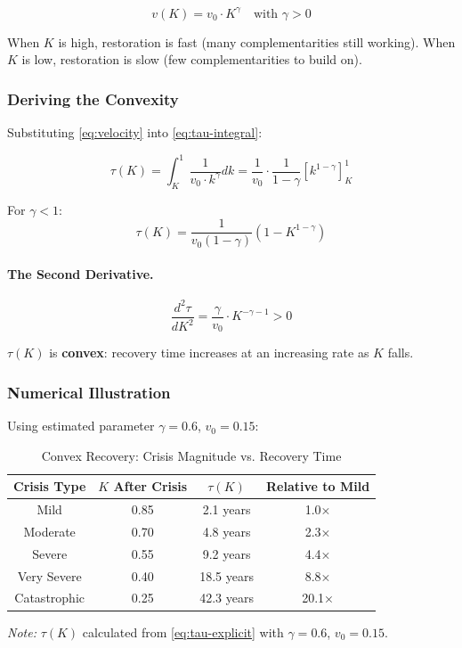\begin{equation}
v(K) = v_0 \cdot K^{\gamma} \quad \text{with } \gamma > 0
\label{eq:velocity}
\end{equation}

When $K$ is high, restoration is fast (many complementarities still working).
When $K$ is low, restoration is slow (few complementarities to build on).

\subsubsection{Deriving the Convexity}

Substituting \eqref{eq:velocity} into \eqref{eq:tau-integral}:

\begin{equation}
\tau(K) = \int_K^{1} \frac{1}{v_0 \cdot k^{\gamma}} dk = \frac{1}{v_0} \cdot \frac{1}{1-\gamma} \left[k^{1-\gamma}\right]_K^1
\end{equation}

For $\gamma < 1$:
\begin{equation}
\tau(K) = \frac{1}{v_0(1-\gamma)} \left(1 - K^{1-\gamma}\right)
\label{eq:tau-explicit}
\end{equation}

\paragraph{The Second Derivative.}
\begin{equation}
\frac{d^2\tau}{dK^2} = \frac{\gamma}{v_0} \cdot K^{-\gamma-1} > 0
\end{equation}

$\tau(K)$ is \textbf{convex}: recovery time increases at an increasing rate 
as $K$ falls.

\subsubsection{Numerical Illustration}

Using estimated parameter $\gamma = 0.6$, $v_0 = 0.15$:

\begin{table}[htbp]
\centering
\caption{Convex Recovery: Crisis Magnitude vs. Recovery Time}
\label{tab:convex-recovery}
\begin{tabular}{@{}cccc@{}}
\toprule
\textbf{Crisis Type} & \textbf{$K$ After Crisis} & \textbf{$\tau(K)$} & \textbf{Relative to Mild} \\
\midrule
Mild & 0.85 & 2.1 years & 1.0× \\
Moderate & 0.70 & 4.8 years & 2.3× \\
Severe & 0.55 & 9.2 years & 4.4× \\
Very Severe & 0.40 & 18.5 years & 8.8× \\
Catastrophic & 0.25 & 42.3 years & 20.1× \\
\bottomrule
\end{tabular}
\begin{flushleft}
\small\textit{Note:} $\tau(K)$ calculated from \eqref{eq:tau-explicit} with $\gamma = 0.6$, $v_0 = 0.15$.
\end{flushleft}
\end{table}

